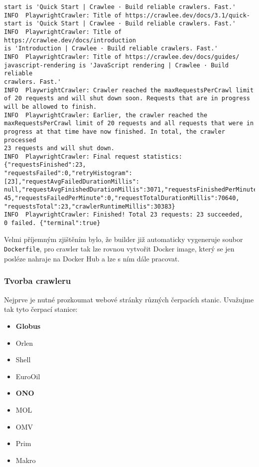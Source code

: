 \begin{verbatim}
start is 'Quick Start | Crawlee · Build reliable crawlers. Fast.'
INFO  PlaywrightCrawler: Title of https://crawlee.dev/docs/3.1/quick-
start is 'Quick Start | Crawlee · Build reliable crawlers. Fast.'
INFO  PlaywrightCrawler: Title of https://crawlee.dev/docs/introduction
is 'Introduction | Crawlee · Build reliable crawlers. Fast.'
INFO  PlaywrightCrawler: Title of https://crawlee.dev/docs/guides/
javascript-rendering is 'JavaScript rendering | Crawlee · Build reliable
crawlers. Fast.'
INFO  PlaywrightCrawler: Crawler reached the maxRequestsPerCrawl limit
of 20 requests and will shut down soon. Requests that are in progress
will be allowed to finish.
INFO  PlaywrightCrawler: Earlier, the crawler reached the
maxRequestsPerCrawl limit of 20 requests and all requests that were in
progress at that time have now finished. In total, the crawler processed
23 requests and will shut down.
INFO  PlaywrightCrawler: Final request statistics: {"requestsFinished":23,
"requestsFailed":0,"retryHistogram":[23],"requestAvgFailedDurationMillis":
null,"requestAvgFinishedDurationMillis":3071,"requestsFinishedPerMinute":
45,"requestsFailedPerMinute":0,"requestTotalDurationMillis":70640,
"requestsTotal":23,"crawlerRuntimeMillis":30383}
INFO  PlaywrightCrawler: Finished! Total 23 requests: 23 succeeded,
0 failed. {"terminal":true}
\end{verbatim}

Velmi příjemným zjištěním bylo, že builder již automaticky vygeneruje
soubor \texttt{Dockerfile}, pro crawler tak lze rovnou vytvořit
Docker image, který se jen posléze nahraje na Docker Hub a lze s ním
dále pracovat.

\subsubsection{Tvorba crawleru}

Nejprve je nutné prozkoumat webové stránky různých čerpacích stanic.
Uvažujme tak tyto čerpací stanice:

\begin{itemize}
    \item \textbf{Globus}
    \item Orlen
    \item Shell
    \item EuroOil
    \item \textbf{ONO}
    \item MOL
    \item OMV
    \item Prim
    \item Makro
\end{itemize}

